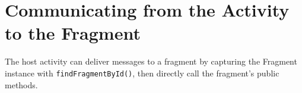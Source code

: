 \section{Communicating from the Activity to the Fragment}
The host activity can deliver messages to a fragment by capturing the Fragment instance with \texttt{findFragmentById()}, then directly call the fragment's public methods.


